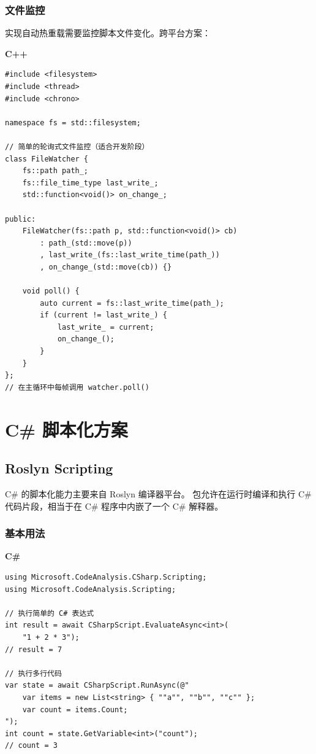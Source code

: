 \documentclass[12pt,a4paper,fontset=fandol]{ctexbook}
\newcommand{\cpplabel}{%
  \noindent\begin{tcolorbox}[colback=algheadbg,coltext=white,
    sharp corners,boxrule=0pt,width=3.0em,height=1.4em,
    halign=center,valign=center,nobeforeafter,left=0pt,right=0pt,
    top=0pt,bottom=0pt]\small\bfseries C++\end{tcolorbox}}
\newcommand{\csharplabel}{%
  \noindent\begin{tcolorbox}[colback=csharpheadbg,coltext=white,
    sharp corners,boxrule=0pt,width=3.2em,height=1.4em,
    halign=center,valign=center,nobeforeafter,left=0pt,right=0pt,
    top=0pt,bottom=0pt]\small\bfseries C\#\end{tcolorbox}}
\begin{document}
\section{文件监控}\label{sec:file-watch}

实现自动热重载需要监控脚本文件变化。跨平台方案：

\cpplabel
\begin{lstlisting}[style=cppstyle]
#include <filesystem>
#include <thread>
#include <chrono>

namespace fs = std::filesystem;

// 简单的轮询式文件监控（适合开发阶段）
class FileWatcher {
    fs::path path_;
    fs::file_time_type last_write_;
    std::function<void()> on_change_;

public:
    FileWatcher(fs::path p, std::function<void()> cb)
        : path_(std::move(p))
        , last_write_(fs::last_write_time(path_))
        , on_change_(std::move(cb)) {}

    void poll() {
        auto current = fs::last_write_time(path_);
        if (current != last_write_) {
            last_write_ = current;
            on_change_();
        }
    }
};
// 在主循环中每帧调用 watcher.poll()
\end{lstlisting}


\part{C\# 脚本化方案}

\chapter{Roslyn Scripting}\label{ch:roslyn}

C\# 的脚本化能力主要来自 Roslyn 编译器平台。
 包允许在运行时编译和执行 C\# 代码片段，相当于在 C\# 程序中内嵌了一个 C\# 解释器。

\section{基本用法}\label{sec:roslyn-basic}

\csharplabel
\begin{lstlisting}[style=csharpstyle]
using Microsoft.CodeAnalysis.CSharp.Scripting;
using Microsoft.CodeAnalysis.Scripting;

// 执行简单的 C# 表达式
int result = await CSharpScript.EvaluateAsync<int>(
    "1 + 2 * 3");
// result = 7

// 执行多行代码
var state = await CSharpScript.RunAsync(@"
    var items = new List<string> { ""a"", ""b"", ""c"" };
    var count = items.Count;
");
int count = state.GetVariable<int>("count");
// count = 3
\end{lstlisting}
\end{document}
